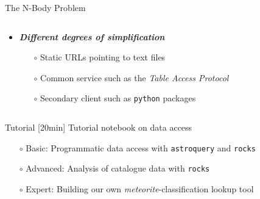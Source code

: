 \begin{frame}[t]{The N-Body Problem}
\begin{columns}[T]
\begin{column}{.7\textwidth}
\begin{overlayarea}{\textwidth}{\textheight}
      \vspace{1.0em}
        \begin{itemize}[<.->]
          \item \emph{\bf Different degrees of simplification}
            \begin{itemize}[<.->]
              \item[$\circ$] Static URLs pointing to text files
              \item[$\circ$] Common service such as the \textit{Table Access Protocol}
              \item[$\circ$] Secondary client such as \texttt{python} packages
            \end{itemize}
        \end{itemize}
      \vspace{0.5em}
      \end{overlayarea}
    \end{column}
  \end{columns}

\end{frame}

\begin{frame}[t]{Tutorial}
  [20min] Tutorial notebook on data access
  \bigskip
  \begin{itemize}
    \item[$\circ$] Basic: Programmatic data access with \texttt{astroquery} and \texttt{rocks}
    \item[$\circ$] Advanced: Analysis of catalogue data with \texttt{rocks}
    \item[$\circ$] Expert: Building our own \emph{meteorite}-classification lookup tool
  \end{itemize}
\end{frame}
